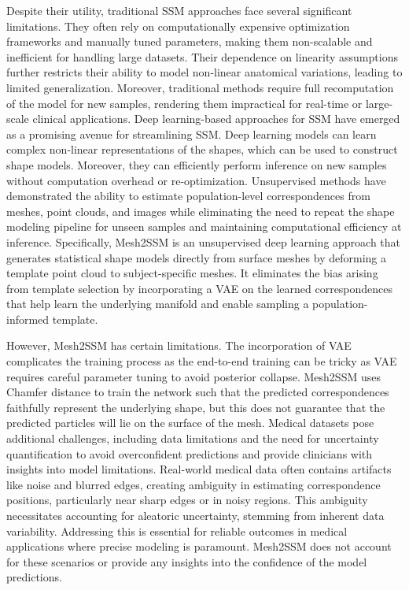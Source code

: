 Despite their utility, traditional SSM approaches face several significant limitations. They often rely on computationally expensive optimization frameworks and manually tuned parameters, making them non-scalable and inefficient for handling large datasets. Their dependence on linearity assumptions further restricts their ability to model non-linear anatomical variations, leading to limited generalization. Moreover, traditional methods require full recomputation of the model for new samples, rendering them impractical for real-time or large-scale clinical applications. Deep learning-based approaches for SSM have emerged as a promising avenue for streamlining SSM. Deep learning models can learn complex non-linear representations of the shapes, which can be used to construct shape models. Moreover, they can efficiently perform inference on new samples without computation overhead or re-optimization. Unsupervised methods \cite{iyer2023mesh2ssm,adams2023point2ssm,ludke2022landmark,bhalodia2024deepssm,bhalodia2018deepssm,el2024universal,kalaie2024end} have demonstrated the ability to estimate population-level correspondences from meshes, point clouds, and images while eliminating the need to repeat the shape modeling pipeline for unseen samples and maintaining computational efficiency at inference. Specifically, Mesh2SSM \cite{iyer2023mesh2ssm} is an unsupervised deep learning approach that generates statistical shape models directly from surface meshes by deforming a template point cloud to subject-specific meshes. It eliminates the bias arising from template selection by incorporating a VAE \cite{kingma2019introduction} on the learned correspondences that help learn the underlying manifold and enable sampling a population-informed template. 

However, Mesh2SSM has certain limitations. The incorporation of VAE complicates the training process as the end-to-end training can be tricky as VAE requires careful parameter tuning to avoid posterior collapse. Mesh2SSM uses Chamfer distance to train the network such that the predicted correspondences faithfully represent the underlying shape, but this does not guarantee that the predicted particles will lie on the surface of the mesh. Medical datasets pose additional challenges, including data limitations and the need for uncertainty quantification to avoid overconfident predictions and provide clinicians with insights into model limitations. Real-world medical data often contains artifacts like noise and blurred edges, creating ambiguity in estimating correspondence positions, particularly near sharp edges or in noisy regions. This ambiguity necessitates accounting for aleatoric uncertainty, stemming from inherent data variability. Addressing this is essential for reliable outcomes in medical applications where precise modeling is paramount. Mesh2SSM does not account for these scenarios or provide any insights into the confidence of the model predictions. 

